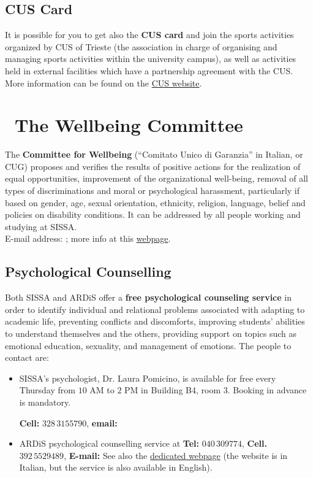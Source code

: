 \documentclass{sissavademecum}
\begin{document}
\section{CUS Card}

It is possible for you to get also the \textbf{CUS card} and join the sports activities organized by CUS of Trieste (the association in charge of organising and managing sports activities within the university campus), as well as activities held in
external facilities which have a partnership agreement with the CUS. More information can be found on the \href{http://www.cus.units.it/home.php}{CUS website}.


\chapter{\texorpdfstring{\faCommentMedical\ }{}The Wellbeing Committee }

The \textbf{Committee for Wellbeing} (``Comitato Unico di Garanzia'' in Italian, or CUG) proposes and verifies the results of positive actions for the realization of equal opportunities, improvement of the organizational well-being, removal of all types of discriminations and moral or psychological harassment, particularly if based on gender, age, sexual orientation, ethnicity, religion, language, belief and policies on disability conditions. It can be addressed by all people working and studying at SISSA.\\
E-mail address: ; more info at this \href{http://www.sissa.it/committee-wellbeing-cug}{webpage}.

\section{Psychological Counselling}

Both SISSA and ARDiS offer a \textbf{free psychological counseling service} in order to identify individual and relational problems associated with adapting to academic life, preventing conflicts and 	discomforts, improving students' abilities to understand themselves and the others, providing support on topics such as emotional education, sexuality, and management of emotions. The people to contact are:
\begin{itemize}
	\item SISSA's psychologist, Dr. Laura Pomicino, is available for free every Thursday from $10$ AM to $2$ PM in Building B4, room $3$. Booking in advance is mandatory. 
	
	\textbf{Cell: }$328 \, 3155790$, \textbf{email: }{}
	
	\item ARDiS psychological counselling service at 	\textbf{Tel: }$040 \, 309774$, \textbf{Cell. }$392 \, 5529489$, \textbf{E-mail:} {} See also the \href{http://www.ardiss.fvg.it/contenuti.php?view=page&id=46}{dedicated webpage} (the website is in Italian, but the service is also available in English).
\end{itemize}
\end{document}
